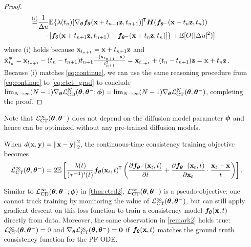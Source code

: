 \begin{appendices}
\begin{proof}
\begin{align*}
        \stackrel{(i)}{=}&\begin{multlined}[t][0.9\displaywidth]
            \frac{1}{\Delta u} \mbb{E}\{\lambda(t_n)[\nabla_\vtheta \vf_\vtheta(\rvx + t_{n+1}\rvz, t_{n+1})]\tran \mH(\vf_{\vtheta^{-}}(\rvx + t_n \rvz, t_n))\\ \cdot [\vf_\vtheta(\rvx + t_{n+1}\rvz, t_{n+1}) - \vf_{\vtheta^-}(\rvx + t_n \rvz, t_n)]\} + \mbb{E}[O(|\Delta u|^2)]
        \end{multlined}
    \end{align*}
    where (i) holds because ${\mathbf{x}}_{t_{n+1}} = {\mathbf{x}} + t_{n+1} {\mathbf{z}}$ and $\hat{{\mathbf{x}}}_{t_n}^{\bm{\phi}} = {\mathbf{x}}_{t_{n+1}} -(t_n - t_{n+1}) t_{n+1} \frac{-({\mathbf{x}}_{t_{n+1}} - {\mathbf{x}})}{t_{n+1}^2} = {\mathbf{x}}_{t_{n+1}} + (t_n - t_{n+1}) {\mathbf{z}} = {\mathbf{x}} + t_n {\mathbf{z}}$. Because (i) matches \cref{eq:continue}, we can use the same reasoning procedure from \cref{eq:continue} to \cref{eq:ctct_grad} to conclude $\lim_{N \to \infty} (N-1)\nabla_{\bm{\theta}} \mathcal{L}_\text{CD}^N({\bm{\theta}}, {\bm{\theta}}^{-}; {\bm{\phi}}) = \lim_{N \to \infty} (N-1)\nabla_{\bm{\theta}} \mathcal{L}_\text{CT}^N({\bm{\theta}}, {\bm{\theta}}^{-})$, completing the proof.
\end{proof}
\begin{remark}
    Note that $\mathcal{L}_\text{CT}^\infty({\bm{\theta}}, {\bm{\theta}}^{-})$ does not depend on the diffusion model parameter ${\bm{\phi}}$ and hence can be optimized without any pre-trained diffusion models.
\end{remark}
\begin{remark}
    When $d({\mathbf{x}}, {\mathbf{y}}) = \left\lVert{\mathbf{x}} - {\mathbf{y}}\right\rVert_2^2$, the continuous-time consistency training objective becomes
    \begin{align}
        \mathcal{L}_\text{CT}^{\infty} ({\bm{\theta}}, {\bm{\theta}}^{-}) = 2\mathbb{E}\left[\frac{\lambda(t)}{(\tau^{-1})'(t)} {\bm{f}}_{\bm{\theta}}({\mathbf{x}}_t, t) ^{\mkern-1.5mu\mathsf{T}} \left(\frac{\partial {\bm{f}}_{{\bm{\theta}}^-}({\mathbf{x}}_t, t)}{\partial t} + \frac{\partial {\bm{f}}_{{\bm{\theta}}^-}({\mathbf{x}}_t, t)}{\partial {\mathbf{x}}_t} \cdot \frac{{\mathbf{x}}_t - {\mathbf{x}}}{t}\right)\right].
    \end{align}
\end{remark}
\begin{remark}
    Similar to $\mathcal{L}_\text{CD}^\infty ({\bm{\theta}}, {\bm{\theta}}^{-}; {\bm{\phi}})$ in \cref{thm:ctcd2}, $\mathcal{L}_\text{CT}^\infty({\bm{\theta}}, {\bm{\theta}}^{-})$ is a pseudo-objective; one cannot track training by monitoring the value of $\mathcal{L}_\text{CT}^\infty({\bm{\theta}}, {\bm{\theta}}^{-})$, but can still apply gradient descent on this loss function to train a consistency model ${\bm{f}}_{\bm{\theta}}({\mathbf{x}}, t)$ directly from data. Moreover, the same observation in \cref{remark2} holds true: $\mathcal{L}_\text{CT}^\infty({\bm{\theta}}, {\bm{\theta}}^{-}) = 0$ and $\nabla_{\bm{\theta}} \mathcal{L}_\text{CT}^\infty({\bm{\theta}}, {\bm{\theta}}^{-}) = \bm{0}$ if ${\bm{f}}_{\bm{\theta}}({\mathbf{x}}, t)$ matches the ground truth consistency function for the PF ODE.
\end{remark}

\end{appendices}
